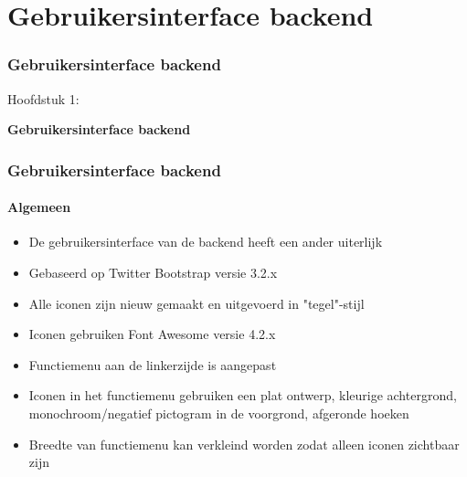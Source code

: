 %

\section{Gebruikersinterface backend	}
\begin{frame}[fragile]
	\frametitle{Gebruikersinterface backend}

	\begin{center}\huge{Hoofdstuk 1:}\end{center}
	\begin{center}\huge{\color{typo3darkgrey}\textbf{Gebruikersinterface backend}}\end{center}

\end{frame}


\begin{frame}[fragile]
	\frametitle{Gebruikersinterface backend}
	\framesubtitle{Algemeen}

	\begin{itemize}
		\item De gebruikersinterface van de backend heeft een ander uiterlijk
		\item Gebaseerd op Twitter Bootstrap versie 3.2.x
		\item Alle iconen zijn nieuw gemaakt en uitgevoerd in "tegel"-stijl
		\item Iconen gebruiken Font Awesome versie 4.2.x
		\item Functiemenu aan de linkerzijde is aangepast
		\item Iconen in het functiemenu gebruiken een plat ontwerp, kleurige achtergrond,
			monochroom/negatief pictogram in de voorgrond, afgeronde hoeken
		\item Breedte van functiemenu kan verkleind worden zodat alleen iconen zichtbaar zijn

	\end{itemize}

\end{frame}

